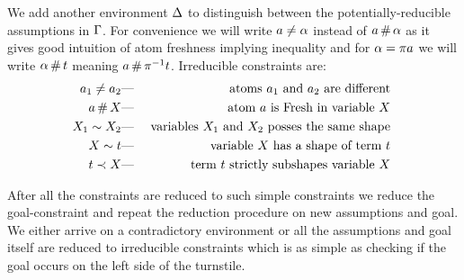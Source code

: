 \documentclass[english, mgr]{iithesis}
\begin{document}
We add another environment $\Delta$ to distinguish between the
potentially-reducible assumptions in $\Gamma$.
For convenience we will write $a \neq \alpha$ instead of $a \,\#\, \alpha$ as it gives
good intuition of atom freshness implying inequality
and for $\alpha = \pi a$ we will write $\alpha \,\#\, t$ meaning
$a \,\#\, \pi^{-1} t$.
Irreducible constraints are:
\begin{eqnarray*}
  a_1 \neq a_2 & \text{---} & \text{
    atoms $a_1$ and $a_2$ are different
  } \\
  a   \,\#\, X   & \text{---} & \text{
    atom $a$ is {Fresh} in variable $X$
  } \\
  X_1 \sim  X_2 & \text{---} & \text{
    variables $X_1$ and $X_2$ posses the same shape
  } \\
  X   \sim  t    & \text{---} & \text{
    variable $X$ has a shape of term $t$
  } \\
  t    \prec  X   & \text{---} & \text{
    term $t$ strictly subshapes variable $X$
  } \\
\end{eqnarray*}

After all the constraints are reduced to such simple constraints
we reduce the goal-constraint and repeat the reduction procedure on
new assumptions and goal. We either arrive on a contradictory environment or
all the assumptions and goal itself are reduced to irreducible constraints which
is as simple as checking if the goal occurs on the left side of the turnstile.
\end{document}
